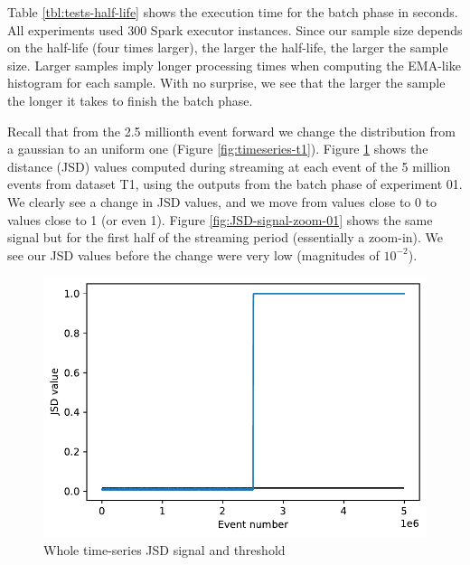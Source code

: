 \documentclass[sigconf]{acmart}
\begin{document}
Table \ref{tbl:tests-half-life} shows the execution time for the batch phase in seconds. All experiments used 300 Spark executor instances. Since our sample size depends on the half-life (four times larger), the larger the half-life, the larger the sample size. Larger samples imply longer processing times when computing the EMA-like histogram for each sample. With no surprise, we see that the larger the sample the longer it takes to finish the batch phase.

Recall that from the 2.5 millionth event forward we change the distribution from a gaussian to an uniform one (Figure \ref{fig:timeseries-t1}). Figure \ref{fig:JSD-signal-01} shows the distance (JSD) values computed during streaming at each event of the 5 million events from dataset T1, using the outputs from the batch phase of experiment 01. We clearly see a change in JSD values, and we move from values close to 0 to values close to 1 (or even 1). Figure \ref{fig:JSD-signal-zoom-01} shows the same signal but for the first half of the streaming period (essentially a zoom-in). We see our JSD values before the change were very low (magnitudes of $10^{-2}$).
\begin{figure}[!htb]
    \begin{center}
      \includegraphics[scale=0.5]{figures/stream-analysis-viz-625.pdf}
      \caption{Whole time-series JSD signal and threshold}
      \label{fig:JSD-signal-01}
    \end{center}
\end{figure}
\end{document}
